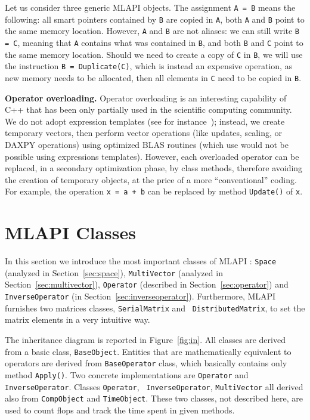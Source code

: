 \documentclass{article}[11pt]
\newcommand{\MLAPI}  {{\sc MLAPI }}
\begin{document}
\noindent
Let us consider three generic \MLAPI objects.
The assignment \verb!A = B! means the following: all smart pointers contained
by \verb!B! are copied in \verb!A!, both \verb!A! and \verb!B! point to the
same memory location. However, \verb!A! and \verb!B! are not aliases: we can
still write \verb!B = C!, meaning that \verb!A! contains what was contained in
\verb!B!, and both \verb!B! and \verb!C! point to the same memory location. 
Should we need to create a copy of \verb!C! in \verb!B!, we will use the
instruction \verb!B = Duplicate(C)!, which is instead an expensive operation, as new memory
needs to be allocated, then all elements in \verb!C! need to be copied in
\verb!B!.

\medskip

\noindent
{\bf Operator overloading.} Operator overloading is an 
interesting capability of C++ that has been only
partially used in the scientific computing community. We do not adopt expression
templates (see for instance~\cite{vandevoorde03cpp}); instead, we
create temporary vectors, then perform vector operations (like updates,
scaling, or DAXPY operations) using optimized BLAS routines 
(which use would not be possible using expressions templates). 
However, each overloaded operator can be replaced, in a secondary
optimization phase, by class methods, therefore
avoiding the creation of temporary objects, at the price of a more
``conventional'' coding. For example, the operation {\tt x = a + b} can be
replaced by method {\tt Update()} of {\tt x}.

\section{\MLAPI Classes}
\label{sec:basic}

In this section we introduce the
most important classes of \MLAPI: {\tt Space} 
(analyzed in Section~\ref{sec:space}), {\tt MultiVector}
(analyzed in Section~\ref{sec:multivector}),
{\tt Operator} (described in Section~\ref{sec:operator}) and 
{\tt InverseOperator} (in Section~\ref{sec:inverseoperator}). Furthermore,
\MLAPI furnishes two matrices classes, {\tt SerialMatrix} and 
{\tt
  DistributedMatrix}, to set the matrix elements in a very intuitive 
  way.

The inheritance diagram is reported in Figure~\ref{fig:in}. All classes are
derived from a basic class, {\tt BaseObject}. Entities that are mathematically
equivalent to operators are derived from {\tt BaseOperator} class, which
basically contains only method {\tt Apply()}. Two concrete implementations are
{\tt Operator} and {\tt InverseOperator}.  Classes {\tt Operator}, {\tt
  InverseOperator}, {\tt MultiVector} all derived also from {\tt CompObject}
  and {\tt TimeObject}. These two classes, not  described here, are used to
  count flops and track the time spent in given methods. 
\end{document}
